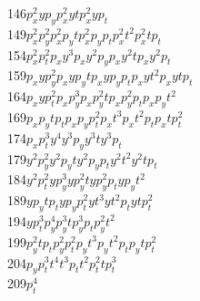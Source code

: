 \begin{tabbing}
146\>$p_x^2 y  p_y      $\>$p_x^2 y  t        $\>$p_x^2 y  p_t      $\\
149\>$p_x^2 p_y^2       $\>$p_x^2 p_yt        $\>$p_x^2 p_yp_t      $\>$p_x^2 t  ^2       $\>$p_x^2 t  p_t      $\\
154\>$p_x^2 p_t^2       $\>$p_xy  ^3          $\>$p_xy  ^2 p_y      $\>$p_xy  ^2 t        $\>$p_xy  ^2 p_t      $\\
159\>$p_xy  p_y^2       $\>$p_xy  p_yt        $\>$p_xy  p_yp_t      $\>$p_xy  t  ^2       $\>$p_xy  t  p_t      $\\
164\>$p_xy  p_t^2       $\>$p_xp_y^3          $\>$p_xp_y^2 t        $\>$p_xp_y^2 p_t      $\>$p_xp_yt  ^2       $\\
169\>$p_xp_yt  p_t      $\>$p_xp_yp_t^2       $\>$p_xt  ^3          $\>$p_xt  ^2 p_t      $\>$p_xt  p_t^2       $\\
174\>$p_xp_t^3          $\>$y  ^4             $\>$y  ^3 p_y         $\>$y  ^3 t           $\>$y  ^3 p_t         $\\
179\>$y  ^2 p_y^2       $\>$y  ^2 p_yt        $\>$y  ^2 p_yp_t      $\>$y  ^2 t  ^2       $\>$y  ^2 t  p_t      $\\
184\>$y  ^2 p_t^2       $\>$y  p_y^3          $\>$y  p_y^2 t        $\>$y  p_y^2 p_t      $\>$y  p_yt  ^2       $\\
189\>$y  p_yt  p_t      $\>$y  p_yp_t^2       $\>$y  t  ^3          $\>$y  t  ^2 p_t      $\>$y  t  p_t^2       $\\
194\>$y  p_t^3          $\>$p_y^4             $\>$p_y^3 t           $\>$p_y^3 p_t         $\>$p_y^2 t  ^2       $\\
199\>$p_y^2 t  p_t      $\>$p_y^2 p_t^2       $\>$p_yt  ^3          $\>$p_yt  ^2 p_t      $\>$p_yt  p_t^2       $\\
204\>$p_yp_t^3          $\>$t  ^4             $\>$t  ^3 p_t         $\>$t  ^2 p_t^2       $\>$t  p_t^3          $\\
209\>$p_t^4             $
\end{tabbing}

